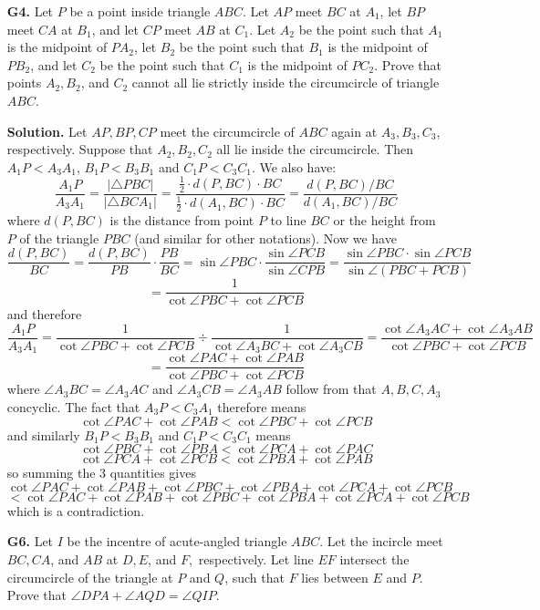 \documentclass[11pt,a4paper]{article}
\begin{document}
\begin{enumerate}
	\item [\textbf{G4.}] Let $P$ be a point inside triangle $ABC$. Let $AP$ meet $BC$ at $A_1$, let $BP$ meet $CA$ at $B_1$, and let $CP$ meet $AB$ at $C_1$. Let $A_2$ be the point such that $A_1$ is the midpoint of $PA_2$, let $B_2$ be the point such that $B_1$ is the midpoint of $PB_2$, and let $C_2$ be the point such that $C_1$ is the midpoint of $PC_2$. Prove that points $A_2, B_2$, and $C_2$ cannot all lie strictly inside the circumcircle of triangle $ABC$.
	
	\textbf{Solution.} Let $AP, BP, CP$ meet the circumcircle of $ABC$ again at $A_3, B_3, C_3$, respectively. 
	Suppose that $A_2, B_2, C_2$ all lie inside the circumcircle. Then $A_1P<A_3A_1$, $B_1P<B_3B_1$ and $C_1P<C_3C_1$. We also have: 
	\[
	\frac{A_1P}{A_3A_1}
	=\frac{|\triangle PBC|}{|\triangle BCA_1|}
	=\frac{\frac 12 \cdot d(P, BC)\cdot BC }{\frac 12 \cdot d(A_1, BC)\cdot BC}
	=\frac{d(P, BC) / BC}{d(A_1, BC) / BC}
	\]
	where $d(P, BC)$ is the distance from point $P$ to line $BC$ or the height from $P$ of the triangle $PBC$ (and similar for other notations). 
	Now we have 
	\[
	\frac{d(P, BC)}{BC}
	=\frac{d(P, BC)}{PB}\cdot \frac{PB}{BC}
	=\sin \angle PBC\cdot \frac{\sin\angle PCB}{\sin\angle CPB}
	=\frac{\sin \angle PBC\cdot\sin \angle PCB}{\sin \angle (PBC+PCB)}
	\]\[
	=\frac{1}{\cot\angle PBC + \cot\angle PCB}
	\]
	and therefore 
	\[
	\frac{A_1P}{A_3A_1}
	=\frac{1}{\cot\angle PBC + \cot\angle PCB}\div \frac{1}{\cot\angle A_3BC + \cot\angle A_3CB}
	=\frac{\cot\angle A_3AC + \cot\angle A_3AB}{\cot\angle PBC + \cot\angle PCB}
	\]\[
	=\frac{\cot\angle PAC + \cot\angle PAB}{\cot\angle PBC + \cot\angle PCB}
	\]
	where $\angle A_3BC=\angle A_3AC$ and $\angle A_3CB=\angle A_3AB$ follow from that $A, B, C, A_3$ concyclic. The fact that $A_3P<C_3A_1$ therefore means 
	\[
	\cot\angle PAC + \cot\angle PAB< \cot\angle PBC + \cot\angle PCB
	\]
	and similarly $B_1P<B_3B_1$ and $C_1P<C_3C_1$ means 
	\[
	\cot\angle PBC + \cot\angle PBA< \cot\angle PCA + \cot\angle PAC
	\]\[
	\cot\angle PCA + \cot\angle PCB< \cot\angle PBA + \cot\angle PAB
	\]
	so summing the 3 quantities gives 
	\[
	\cot\angle PAC + \cot\angle PAB+\cot\angle PBC + \cot\angle PBA+\cot\angle PCA + \cot\angle PCB
	\]
	\[
	< \cot\angle PAC + \cot\angle PAB+\cot\angle PBC + \cot\angle PBA+\cot\angle PCA + \cot\angle PCB
	\]
	which is a contradiction. 
	
	
	\item [\textbf{G6.}] Let $I$ be the incentre of acute-angled triangle $ABC$. Let the incircle meet $BC, CA$, and $AB$ at $D, E$, and $F,$ respectively. Let line $EF$ intersect the circumcircle of the triangle at $P$ and $Q$, such that $F$ lies between $E$ and $P$. Prove that $\angle DPA + \angle AQD =\angle QIP$.
	

\end{enumerate}
\end{document}
